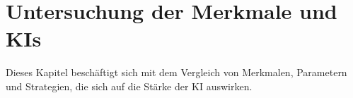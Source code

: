 
\chapter{Untersuchung der Merkmale und KIs}
\label{chap:merkmale}

Dieses Kapitel beschäftigt sich mit dem Vergleich von Merkmalen, Parametern und Strategien, die sich auf die Stärke der KI auswirken.




